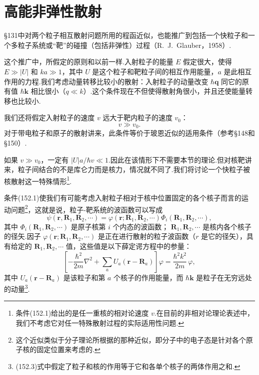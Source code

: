 \section{高能非弹性散射}

§131中对两个粒子相互散射问题所用的程函近似，也能推广到包括一个快粒子和一个多粒子系统或“靶”的碰撞（包括非弹性）过程（R.~J.~Glauber，1958）.

这个推广中，所假定的原则和以前一样.入射粒子的能量 $E$ 假定很大，使得 $E\gg|U|$ 和 $ka\gg1$，其中 $U$ 是这个粒子和靶粒子间的相互作用能量，$a$ 是此相互作用的力程.我们考虑动量转移比较小的散射：入射粒子的动量改变 $\hbar\boldsymbol{q}$ 同它的原有值 $\hbar\boldsymbol{k}$ 相比很小（$q\ll k$）.这个条件现在不但使得散射角很小，并且还使能量转移也比较小.

我们还将假定入射粒子的速度 $v$ 远大于靶内粒子的速度 $v_0$：
\begin{equation}
  v\gg v_0.
\end{equation}
对于带电粒子和原子的散射讲来，此条件等价于玻恩近似的适用条件（参考§148和§150）.

如果 $v\gg v_0$，一定有 $|U|a/\hbar v\ll1$.因此在该情形下不需要本节的理论.但对核靶讲来，粒子间结合的不是库仑力而是核力，情况就不同了.我们将讨论一个快粒子被核散射这一特殊情形\footnote{条件(152.1)给出的是任一重核的相对论速度 $v$.在目前的非相对论理论表述中，我们不考虑它对任一特殊散射过程的实际适用性问题.}.

条件(152.1)使我们有可能考虑入射粒子相对于核中位置固定的各个核子而言的运动问题\footnote{这个近似类似于分子理论所根据的那种近似，即分子中的电子态是针对各个原子核的固定位置来考虑的.}，这就是说，粒子-靶系统的波函数可以写成
\begin{equation}
  \psi(\boldsymbol{r},\boldsymbol{R}_1,\boldsymbol{R}_2,\cdots)
  =\varphi(\boldsymbol{r};\boldsymbol{R}_1,\boldsymbol{R}_2,\cdots)
  \Phi_i(\boldsymbol{R}_1,\boldsymbol{R}_2,\cdots),
\end{equation}
其中 $\Phi_i(\boldsymbol{R}_1,\boldsymbol{R}_2,\cdots)$ 是原子核第 $i$ 个内态的波函数；\linebreak
$\boldsymbol{R}_1,\boldsymbol{R}_2,\cdots$ 是核内各个核子的径矢.因子
$\varphi(\boldsymbol{r};\boldsymbol{R}_1,\boldsymbol{R}_2,\cdots)$ 是正在进行散射的粒子波函数（$r$ 是它的径矢），具有给定的 $\boldsymbol{R}_1,\boldsymbol{R}_2,\cdots$ 值，这些值是以下薛定谔方程中的参量：
\begin{equation}
  \left[-\frac{\hbar^2}{2m}\nabla^2+\sum_aU_a(\boldsymbol{r}-\boldsymbol{R}_a)\right]\varphi
  =\frac{\hbar^2k^2}{2m}\,\varphi,
\end{equation}
其中 $U_a(\boldsymbol{r}-\boldsymbol{R}_a)$ 是该粒子和第 $a$ 个核子的作用能量，而 $\hbar\boldsymbol{k}$ 是粒子在无穷远处的动量\footnote{(152.3)式中假定了粒子和核的作用等于它和各单个核子的两体作用之和.}.


